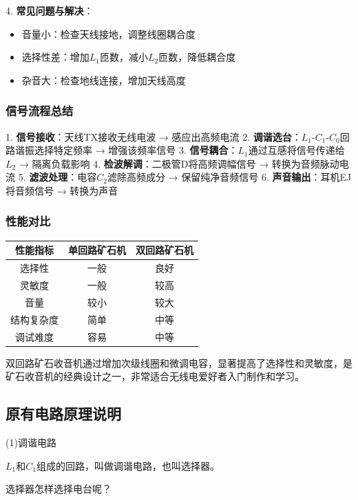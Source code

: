 \documentclass[12pt,UTF8]{ctexbook}
\begin{document}
4. \textbf{常见问题与解决}：\begin{itemize}
  \item 音量小：检查天线接地，调整线圈耦合度
  \item 选择性差：增加$L_1$匝数，减小$L_2$匝数，降低耦合度
  \item 杂音大：检查地线连接，增加天线高度\end{itemize}

\subsubsection{信号流程总结}

1. \textbf{信号接收}：天线TX接收无线电波 → 感应出高频电流
2. \textbf{调谐选台}：$L_1$-$C_1$-$C_0$回路谐振选择特定频率 → 增强该频率信号
3. \textbf{信号耦合}：$L_1$通过互感将信号传递给$L_2$ → 隔离负载影响
4. \textbf{检波解调}：二极管D将高频调幅信号 → 转换为音频脉动电流
5. \textbf{滤波处理}：电容$C_2$滤除高频成分 → 保留纯净音频信号
6. \textbf{声音输出}：耳机EJ将音频信号 → 转换为声音

\subsubsection{性能对比}

\begin{center}
\begin{tabular}{|c|c|c|}
\hline
性能指标 & 单回路矿石机 & 双回路矿石机 \\
\hline
选择性 & 一般 & 良好 \\
灵敏度 & 一般 & 较高 \\
音量 & 较小 & 较大 \\
结构复杂度 & 简单 & 中等 \\
调试难度 & 容易 & 中等 \\
\hline
\end{tabular}
\end{center}

双回路矿石收音机通过增加次级线圈和微调电容，显著提高了选择性和灵敏度，是矿石收音机的经典设计之一，非常适合无线电爱好者入门制作和学习。

\subsection{原有电路原理说明}

(1)调谐电路

$L_{1}$和$C_{1}$组成的回路，叫做调谐电路，也叫选择器。

选择器怎样选择电台呢？
\end{document}
